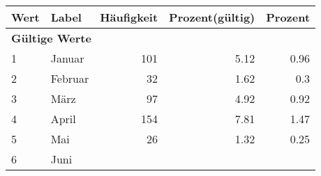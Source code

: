      \begin{longtable}{lXrrr}
     \toprule
     \textbf{Wert} & \textbf{Label} & \textbf{Häufigkeit} & \textbf{Prozent(gültig)} & \textbf{Prozent} \\
     \endhead
     \midrule
     \multicolumn{5}{l}{\textbf{Gültige Werte}}\\

     1 &
     \multicolumn{1}{X}{ Januar   } &


       \num{101} &
       \num[round-mode=places,round-precision=2]{5.12} &
         \num[round-mode=places,round-precision=2]{0.96} \\

     2 &
     \multicolumn{1}{X}{ Februar   } &


       \num{32} &
       \num[round-mode=places,round-precision=2]{1.62} &
         \num[round-mode=places,round-precision=2]{0.3} \\

     3 &
     \multicolumn{1}{X}{ März   } &


       \num{97} &
       \num[round-mode=places,round-precision=2]{4.92} &
         \num[round-mode=places,round-precision=2]{0.92} \\

     4 &
     \multicolumn{1}{X}{ April   } &


       \num{154} &
       \num[round-mode=places,round-precision=2]{7.81} &
         \num[round-mode=places,round-precision=2]{1.47} \\

     5 &
     \multicolumn{1}{X}{ Mai   } &


       \num{26} &
       \num[round-mode=places,round-precision=2]{1.32} &
         \num[round-mode=places,round-precision=2]{0.25} \\

     6 &
     \multicolumn{1}{X}{ Juni   } &



\end{longtable}
